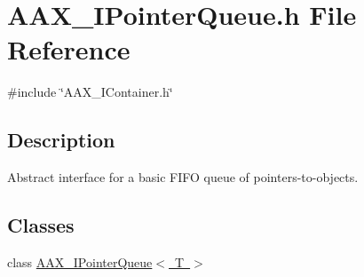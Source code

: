 \hypertarget{a00626}{}\section{A\+A\+X\+\_\+\+I\+Pointer\+Queue.\+h File Reference}
\label{a00626}
{\ttfamily \#include \char`\"{}A\+A\+X\+\_\+\+I\+Container.\+h\char`\"{}}\newline


\subsection{Description}
Abstract interface for a basic F\+I\+FO queue of pointers-\/to-\/objects. 

\subsection*{Classes}
\begin{DoxyCompactItemize}
\item 
class \mbox{\hyperlink{a01861}{A\+A\+X\+\_\+\+I\+Pointer\+Queue$<$ T $>$}}
\end{DoxyCompactItemize}
